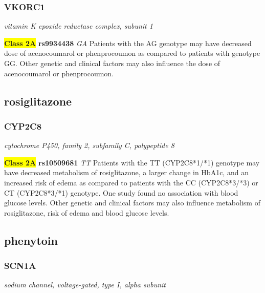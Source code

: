 \documentclass{report}
\begin{document}
\subsubsection{ VKORC1 }
\textit{ vitamin K epoxide reductase complex, subunit 1 } \newline




\textbf{\colorbox{yellow} {Class 2A}} \textbf{ rs9934438 } \textit{ GA }
Patients with the AG genotype may have decreased dose of acenocoumarol or phenprocoumon as compared to patients with genotype GG. Other genetic and clinical factors may also influence the dose of acenocoumarol or phenprocoumon.\newline



\subsection{ rosiglitazone }\subsubsection{ CYP2C8 }
\textit{ cytochrome P450, family 2, subfamily C, polypeptide 8 } \newline




\textbf{\colorbox{yellow} {Class 2A}} \textbf{ rs10509681 } \textit{ TT }
Patients with the TT (CYP2C8*1/*1) genotype may have decreased metabolism of rosiglitazone, a larger change in HbA1c, and an increased risk of edema as compared to patients with the CC (CYP2C8*3/*3) or CT (CYP2C8*3/*1) genotype. One study found no association with blood glucose levels. Other genetic and clinical factors may also influence metabolism of rosiglitazone, risk of edema and blood glucose levels.\newline



\subsection{ phenytoin }\subsubsection{ SCN1A }
\textit{ sodium channel, voltage-gated, type I, alpha subunit } \newline
\end{document}

